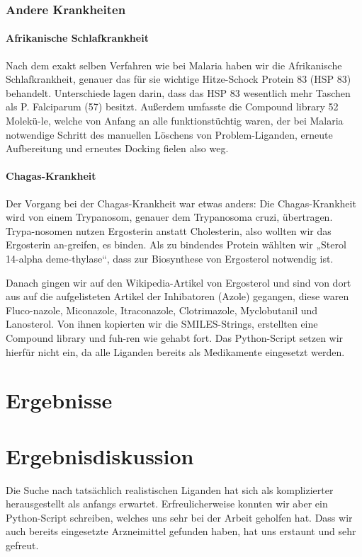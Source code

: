 \documentclass[11pt]{article}
\begin{document}

    \subsubsection{Andere Krankheiten}\label{subsubsec:andere-krankheiten}

    \paragraph{Afrikanische Schlafkrankheit}
    Nach dem exakt selben Verfahren wie bei Malaria haben wir die Afrikanische Schlafkrankheit, genauer das für sie wichtige Hitze-Schock Protein 83 (HSP 83) behandelt.
    Unterschiede lagen darin, dass das HSP 83 wesentlich mehr Taschen als P. Falciparum (57) besitzt.
    Außerdem umfasste die Compound library 52 Molekü-le, welche von Anfang an alle funktionstüchtig waren, der bei Malaria notwendige Schritt des manuellen Löschens von Problem-Liganden, erneute Aufbereitung und erneutes Docking fielen also weg.

    \paragraph{Chagas-Krankheit}
    Der Vorgang bei der Chagas-Krankheit war etwas anders: Die Chagas-Krankheit wird von einem Trypanosom, genauer dem Trypanosoma cruzi, übertragen.
    Trypa-nosomen nutzen Ergosterin anstatt Cholesterin, also wollten wir das Ergosterin an-greifen, es binden.
    Als zu bindendes Protein wählten wir „Sterol 14-alpha deme-thylase“, dass zur Biosynthese von Ergosterol notwendig ist.

    Danach gingen wir auf den Wikipedia-Artikel von Ergosterol und sind von dort aus auf die aufgelisteten Artikel der Inhibatoren (Azole) gegangen, diese waren Fluco-nazole, Miconazole, Itraconazole, Clotrimazole, Myclobutanil und Lanosterol.
    Von ihnen kopierten wir die SMILES-Strings, erstellten eine Compound library und fuh-ren wie gehabt fort.
    Das Python-Script setzen wir hierfür nicht ein, da alle Liganden bereits als Medikamente eingesetzt werden.


    \section{Ergebnisse}\label{sec:ergebnisse}



    \section{Ergebnisdiskussion}\label{sec:ergebnisdiskussion}
    Die Suche nach tatsächlich realistischen Liganden hat sich als komplizierter herausgestellt als anfangs erwartet.
    Erfreulicherweise konnten wir aber ein Python-Script schreiben, welches uns sehr bei der Arbeit geholfen hat.
    Dass wir auch bereits eingesetzte Arzneimittel gefunden haben, hat uns erstaunt und sehr gefreut.
\end{document}
